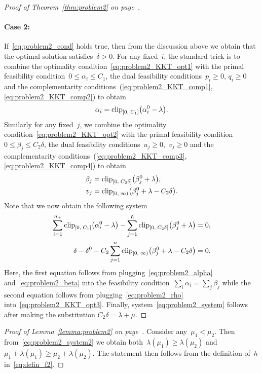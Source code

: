 \begin{proof}[Proof of Theorem~\ref{thm:problem2} on page~\pageref{thm:problem2}]
  \paragraph*{Case 2:} If~\eqref{eq:problem2_cond} holds true, then from the discussion above we obtain that the optimal solution satisfies~$\delta > 0$. For any fixed~$i$, the standard trick is to combine the optimality condition~\eqref{eq:problem2_KKT_opt1} with the primal feasibility condition~$0 \le \alpha_i \le C_1$, the dual feasibility conditions~$p_i \ge 0$, $q_i \ge 0$ and the complementarity conditions~(\ref{eq:problem2_KKT_comp1}, \ref{eq:problem2_KKT_comp2}) to obtain
  \begin{equation}\label{eq:problem2_alpha}
    \alpha_i = \clip{0}{C_1}{\alpha_i^0 - \lambda}.
  \end{equation}
  Similarly for any fixed~$j$, we combine the optimality condition~\eqref{eq:problem2_KKT_opt2} with the primal feasibility condition~$0 \le \beta_j \le C_2 \delta$, the dual feasibility conditions~$u_j \ge 0,$ $v_j \ge 0$ and the complementarity conditions~(\ref{eq:problem2_KKT_comp3}, \ref{eq:problem2_KKT_comp4}) to obtain
  \begin{align}
    \beta_j & = \clip{0}{C_2 \delta}{\beta_j^0 + \lambda}, \label{eq:problem2_beta} \\
    v_j & = \clip[u]{0}{\infty}{\beta_j^0 + \lambda - C_2 \delta}. \label{eq:problem2_rho}
  \end{align}
  Note that we now obtain the following system
  \begin{align*}
    \sum_{i=1}^{\npos} \clip{0}{C_1}{\alpha_i^0 - \lambda} - \sum_{j = 1}^{\ntil} \clip{0}{C_2 \delta}{\beta_j^0 + \lambda}
      & = 0, \\
    \delta - \delta^0 - C_2 \sum_{j = 1}^{\ntil} \clip[u]{0}{\infty}{\beta_j^0 + \lambda - C_2 \delta}
      & = 0.
  \end{align*}
  Here, the first equation follows from plugging~\eqref{eq:problem2_alpha} and~\eqref{eq:problem2_beta} into the feasibility condition~$\sum_i \alpha_i =\sum_j \beta_j$ while the second equation follows from plugging~\eqref{eq:problem2_rho} into~\eqref{eq:problem2_KKT_opt3}. Finally, system~\eqref{eq:problem2_system} follows after making the substitution $C_2 \delta = \lambda + \mu$.
\end{proof}

\patinith*
\begin{proof}[Proof of Lemma~\ref{lemma:problem2} on page~\pageref{lemma:problem2}]
  Consider any~$\mu_1 < \mu_2$. Then from~\eqref{eq:problem2_system2} we obtain both~$\lambda(\mu_1) \ge \lambda(\mu_2)$ and~$\mu_1+\lambda(\mu_1) \ge \mu_2 + \lambda(\mu_2)$. The statement then follows from the definition of~$h$ in~\eqref{eq:defin_f2}.
\end{proof}
